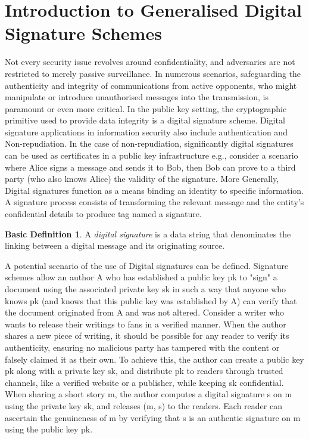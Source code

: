 \documentclass[]{final_report}
\theoremstyle{definition}
\newtheorem{basic}{Basic Definition}
\begin{document}
\section{Introduction to Generalised Digital Signature Schemes}
Not every security issue revolves around confidentiality, and adversaries are not restricted to merely passive surveillance. In numerous scenarios, safeguarding the authenticity and integrity of communications from active opponents, who might manipulate or introduce unauthorised messages into the transmission, is paramount or even more critical. In the public key setting, the cryptographic primitive used to provide data integrity is a digital signature scheme. Digital signature applications in information security also include authentication and Non-repudiation. In the case of non-repudiation, significantly digital signatures can be used as certificates in a public key infrastructure e.g., consider a scenario where Alice signs a message and sends it to Bob, then Bob can prove to a third party (who also knows Alice) the validity of the signature.
More Generally, Digital signatures function as a means binding an identity to specific information. A signature process consists of transforming the relevant message and the entity's confidential details to produce tag named a signature.  
\begin{basic}
\label{basicDef:digital signature}
A \textit{digital signature} is a data string that denominates the linking between a digital message and its originating source.
\end{basic}
A potential scenario of the use of Digital signatures can be defined. Signature schemes allow an author A who has established a public key pk to "sign" a document using the associated private key sk in such a way that anyone who knows pk (and knows that this public key was established by A) can verify that the document originated from A and was not altered.
Consider a writer who wants to release their writings to fans in a verified manner. When the author shares a new piece of writing, it should be possible for any reader to verify its authenticity, ensuring no malicious party has tampered with the content or falsely claimed it as their own. To achieve this, the author can create a public key pk along with a private key sk, and distribute pk to readers through trusted channels, like a verified website or a publisher, while keeping sk confidential. When sharing a short story m, the author computes a digital signature s on m using the private key sk, and releases (m, s) to the readers. Each reader can ascertain the genuineness of m by verifying that s is an authentic signature on m using the public key pk. 
\end{document}
